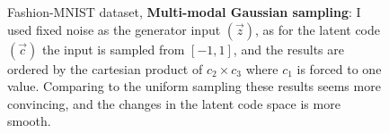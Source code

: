 \documentclass[letterpaper,12pt]{article}
\begin{document}
\begin{figure}[H]       
    \hspace{30px}
    \hspace{30px}
    \caption{Fashion-MNIST dataset, \textbf{Multi-modal Gaussian sampling}: I used fixed noise as the generator input $(\vec{z})$, as for the latent code $(\vec{c})$ the input is sampled from $[-1,1]$, and the results are ordered by the cartesian product of \( c_2 \times c_3\) where \(c_1\) is forced to one value. Comparing to the uniform sampling these results seems more convincing, and the changes in the latent code space is more smooth.}
    \label{fashion_mnist_2}
\end{figure}
\end{document}
